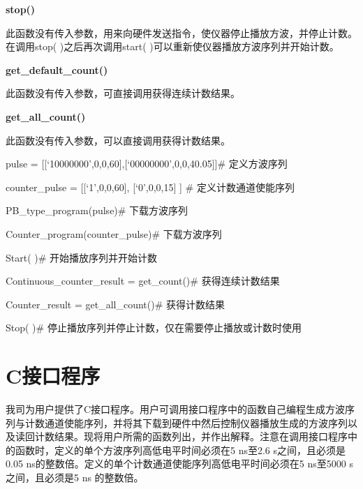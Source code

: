 \noindent\fontsize{12pt}{\baselineskip}\textbf{stop()}

此函数没有传入参数，用来向硬件发送指令，使仪器停止播放方波，并停止计数。在调用stop( )之后再次调用start( )可以重新使仪器播放方波序列并开始计数。
\vspace{0.4cm}

\noindent\fontsize{12pt}{\baselineskip}\textbf{get\_default\_count()}

此函数没有传入参数，可直接调用获得连续计数结果。
\vspace{0.4cm}

\noindent\fontsize{12pt}{\baselineskip}\textbf{get\_all\_count()}

此函数没有传入参数，可以直接调用获得计数结果。
\vspace{0.4cm}

\noindent\fontsize{12pt}{\baselineskip}\textbf{}

pulse = [[`10000000',0,0,60],[`00000000',0,0,40.05]]\qquad  \#  定义方波序列

counter\_pulse = [[`1',0,0,60], [`0',0,0,15] ]       \qquad  \#  定义计数通道使能序列

PB\_type\_program(pulse)\qquad            \#  下载方波序列

Counter\_program(counter\_pulse)\qquad     \#  下载方波序列

Start( )\qquad          \#  开始播放序列并开始计数

Continuous\_counter\_result = get\_count()\qquad    \#  获得连续计数结果

Counter\_result = get\_all\_count()\qquad           \#  获得计数结果

Stop( )\qquad     \#  停止播放序列并停止计数，仅在需要停止播放或计数时使用

\section{C\heiti 接口程序}
我司为用户提供了C接口程序。用户可调用接口程序中的函数自己编程生成方波序列与计数通道使能序列，并将其下载到硬件中然后控制仪器播放生成的方波序列以及读回计数结果。现将用户所需的函数列出，并作出解释。注意在调用接口程序中的函数时，定义的单个方波序列高低电平时间必须在5 ns至2.6 s之间，且必须是0.05 ns的整数倍。定义的单个计数通道使能序列高低电平时间必须在5 ns至5000 s之间，且必须是5 ns 的整数倍。


